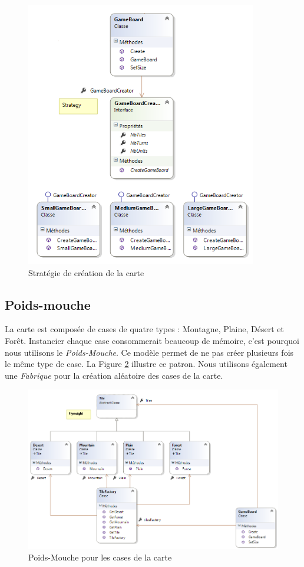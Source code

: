 \documentclass[a4paper]{article}
\begin{document}
\begin{figure}[ht]
\centering
	\includegraphics[width=0.9\textwidth,height=0.7\textheight]{../Schemas/class_GameBoardBuilder_Strategy.png}
		\caption{Stratégie de création de la carte}
		\label{fig:class_strategy}
\end{figure}

\clearpage
	\subsection{Poids-mouche}
La carte est composée de cases de quatre types : Montagne, Plaine, Désert et Forêt. Instancier chaque case consommerait beaucoup de mémoire, c'est pourquoi nous utilisons le \textit{Poids-Mouche}. Ce modèle permet de ne pas créer plusieurs fois le même type de case. La Figure \ref{fig:class_poidsmouche} illustre ce patron. Nous utilisons également une \textit{Fabrique} pour la création aléatoire des cases de la carte.

\begin{figure}[ht]
\centering
	\includegraphics[width=\textwidth]{../Schemas/class_GameBoard_PoidsMouche.png}
		\caption{Poids-Mouche pour les cases de la carte}
		\label{fig:class_poidsmouche}
\end{figure}
\end{document}
